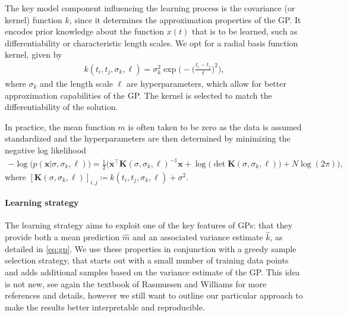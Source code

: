 \documentclass[AMA,STIX1COL]{WileyNJD-v2}
\newcommand{\mb}[1]{\mathbf{#1}}
\newcommand{\T}{{\!\top}}
\begin{document}
The key model component influencing the learning process is the covariance (or kernel) function $k$, since it determines the approximation properties of the GP. It encodes prior knowledge about the function $x(t)$ that is to be learned, such as differentiability or characteristic length scales. We opt for a radial basis function kernel, given by
\begin{align*}
    k(t_i, t_j, \sigma_k, \ell) = \sigma_k^2 \exp \biggl(- \Big( \frac{t_i - t_j}{\ell} \Big)^2 \biggr),
\end{align*}
where $\sigma_k$ and the length scale $\ell$ are hyperparameters, which allow for better approximation capabilities of the GP. The kernel is selected to match the differentiability of the solution.

In practice, the mean function $m$ is often taken to be zero as the data is assumed standardized and the hyperparameters are then determined by minimizing the negative log likelihood\cite{basak2021}
\begin{align*}
    -\log \bigl( p(\mb{x} | \sigma, \sigma_k, \ell) \bigr) = \frac{1}{2} \big( \mb{x}^\T \mb{K}(\sigma, \sigma_k, \ell)^{-1} \mb{x} + \log \bigl( \det \mb{K}(\sigma, \sigma_k, \ell) \bigr) + N \log(2\pi) \big),
\end{align*}
where $[\mb{K}(\sigma, \sigma_k, \ell)]_{i,j} \coloneqq k(t_i, t_j, \sigma_k, \ell) + \sigma^2$.

\paragraph{Learning strategy}
The learning strategy aims to exploit one of the key features of GPs: that they provide both a mean prediction $\hat{m}$ and an associated variance estimate $\hat{k}$, as detailed in \eqref{eq:gp}. We use these properties in conjunction with a greedy sample selection strategy, that starts out with a small number of training data points and adds additional samples based on the variance estimate of the GP. This idea is not new, see again the textbook of Rasmussen and Williams\cite{rasmussen2006} for more references and details, however we still want to outline our particular approach to make the results better interpretable and reproducible.
\end{document}
